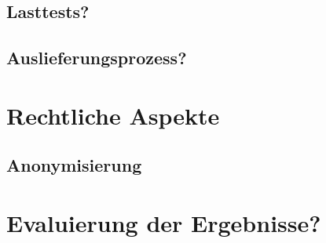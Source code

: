 \subsection{Lasttests?}
\subsection{Auslieferungsprozess?}

\section{Rechtliche Aspekte}
\subsection{Anonymisierung}

\section{Evaluierung der Ergebnisse?}
